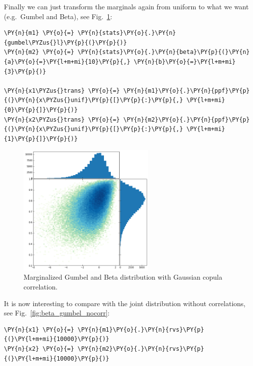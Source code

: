  Finally we can just transform the marginals again from uniform to what we want
(e.g.~Gumbel and Beta), see Fig.~\ref{fig:beta_gumbel_corr}:

    \begin{tcolorbox}[breakable, size=fbox, boxrule=1pt, pad at break*=1mm,colback=cellbackground, colframe=cellborder]
\begin{Verbatim}[commandchars=\\\{\}]
\PY{n}{m1} \PY{o}{=} \PY{n}{stats}\PY{o}{.}\PY{n}{gumbel\PYZus{}l}\PY{p}{(}\PY{p}{)}
\PY{n}{m2} \PY{o}{=} \PY{n}{stats}\PY{o}{.}\PY{n}{beta}\PY{p}{(}\PY{n}{a}\PY{o}{=}\PY{l+m+mi}{10}\PY{p}{,} \PY{n}{b}\PY{o}{=}\PY{l+m+mi}{3}\PY{p}{)}

\PY{n}{x1\PYZus{}trans} \PY{o}{=} \PY{n}{m1}\PY{o}{.}\PY{n}{ppf}\PY{p}{(}\PY{n}{x\PYZus{}unif}\PY{p}{[}\PY{p}{:}\PY{p}{,} \PY{l+m+mi}{0}\PY{p}{]}\PY{p}{)}
\PY{n}{x2\PYZus{}trans} \PY{o}{=} \PY{n}{m2}\PY{o}{.}\PY{n}{ppf}\PY{p}{(}\PY{n}{x\PYZus{}unif}\PY{p}{[}\PY{p}{:}\PY{p}{,} \PY{l+m+mi}{1}\PY{p}{]}\PY{p}{)}
\end{Verbatim}
\end{tcolorbox}

    \begin{figure}[htbp]
    \centering
    \includegraphics[width=0.6\textwidth]{copula_files/copula_13_0.png}
    \caption{Marginalized Gumbel and Beta distribution with Gaussian copula correlation.}
    \label{fig:beta_gumbel_corr}
    \end{figure}
    
    It is now interesting to compare with the joint distribution without
correlations, see Fig.~\ref{fig:beta_gumbel_nocorr}:

    \begin{tcolorbox}[breakable, size=fbox, boxrule=1pt, pad at break*=1mm,colback=cellbackground, colframe=cellborder]
\begin{Verbatim}[commandchars=\\\{\}]
\PY{n}{x1} \PY{o}{=} \PY{n}{m1}\PY{o}{.}\PY{n}{rvs}\PY{p}{(}\PY{l+m+mi}{10000}\PY{p}{)}
\PY{n}{x2} \PY{o}{=} \PY{n}{m2}\PY{o}{.}\PY{n}{rvs}\PY{p}{(}\PY{l+m+mi}{10000}\PY{p}{)}
\end{Verbatim}
\end{tcolorbox}

